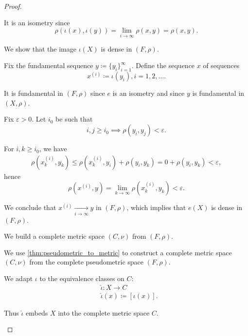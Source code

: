 \begin{proof}
\begin{defenum}
    It is an isometry since
    \begin{equation*}
      \rho(\iota(x),\iota(y)) = \lim_{i \to \infty} \rho(x, y) = \rho(x, y).
    \end{equation*}

     We show that the image \( \iota(X) \) is dense in \( (F, \rho) \).

    Fix the fundamental sequence \( y \coloneqq \{ y_i \}_{i=1}^\infty \). Define the sequence \( x \) of sequences
    \begin{equation*}
      x^{(i)} \coloneqq \iota(y_i), i = 1, 2, \ldots.
    \end{equation*}

    It is fundamental in \( (F, \rho) \) since \( e \) is an isometry and since \( y \) is fundamental in \( (X, \rho) \).

    Fix \( \varepsilon > 0 \). Let \( i_0 \) be such that
    \begin{equation*}
      i, j \geq i_0 \implies \rho(y_i, y_j) < \varepsilon.
    \end{equation*}

    For \( i, k \geq i_0 \), we have
    \begin{align*}
      \rho(x_k^{(i)}, y_k)
      \leq
      \rho(x_k^{(i)}, y_i) + \rho(y_i, y_k)
      =
      0 + \rho(y_i, y_k)
      <
      \varepsilon,
    \end{align*}
    hence
    \begin{equation*}
      \rho(x^{(i)}, y) = \lim_{k \to \infty} \rho(x_k^{(i)}, y_k) < \varepsilon.
    \end{equation*}

    We conclude that \( x^{(i)} \xrightarrow[i \to \infty]{} y \) in \( (F, \rho) \), which implies that \( e(X) \) is dense in \( (F, \rho) \).

     We build a complete metric space \( (C, \nu) \) from \( (F, \rho) \).

    We use \cref{thm:pseudometric_to_metric} to construct a complete metric space \( (C, \nu) \) from the complete pseudometric space \( (F, \rho) \).

    We adapt \( \iota \) to the equivalence classes on \( C \):
    \begin{align*}
      &\hat\iota: X \to C \\
      &\hat\iota(x) \coloneqq [\iota(x)].
    \end{align*}

    Thus \( \hat\iota \) embeds \( X \) into the complete metric space \( C \).
  \end{defenum}
\end{proof}

